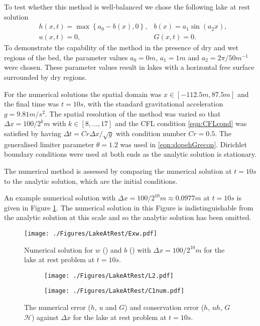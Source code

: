 \documentclass[AMA,STIX1COL]{WileyNJD-v2}
\DeclareRobustCommand{\squareF}[1]{\tikz{\filldraw[#1,fill opacity= 0.3] (0,0) rectangle (0.2cm,0.2cm);}}
\begin{document}
To test whether this method is well-balanced we chose the following lake at rest solution
	\begin{align*}
	&h(x,t) = \max\left\lbrace a_0 - b(x), 0 \right\rbrace, & b(x) = a_1 \sin\left(a_2 x\right), \\
	&u(x,t) = 0 , 	&G(x,t) = 0.
	\end{align*}
To demonstrate the capability of the method in the presence of dry and wet regions of the bed, the parameter values $a_0 = 0m$, $a_1 = 1m$ and $a_2 = 2 \pi / 50 m^{-1} $ were chosen. These parameter values result in lakes with a horizontal free surface surrounded by dry regions.

For the numerical solutions the spatial domain was $x \in \left[-112.5 m,87.5 m\right]$ and the final time was $t=10s$, with the standard gravitational acceleration $g= 9.81 m/s^2$. The spatial resolution of the method was varied so that $\Delta x = 100 / 2^k m$ with $k \in \left[8, \dots ,17\right]$ and the CFL condition \eqref{eqn:CFLcond} was satisfied by having $\Delta t = Cr \Delta x / \sqrt{g}$ with condition number $Cr = 0.5$. The generalised limiter parameter $\theta = 1.2$ was used in \eqref{eqn:slopehGrecon}. Dirichlet boundary conditions were used at both ends as the analytic solution is stationary.

The numerical method is assessed by comparing the numerical solution at $t=10s$ to the analytic solution, which are the initial conditions.

An example numerical solution with $\Delta x = 100/2^{10}m \approx 0.0977m$ at $t=10s$ is given in Figure \ref{fig:LAR}. The numerical solution in this Figure is indistinguishable from the analytic solution at this scale and so the analytic solution has been omitted. 

\begin{figure}
	\centering
		\texttt{[image: ./Figures/LakeAtRest/Exw.pdf]}
	\caption{Numerical solution for $w$ (\squareF{blue}) and $b$ (\squareF{brown!60!black}) with $\Delta x = {100} / {2^{10}}m $ for the lake at rest problem at $t=10s$.}
	\label{fig:LAR}
\end{figure}
\begin{figure}
	\centering
	\begin{subfigure}{0.49\textwidth}
		\texttt{[image: ./Figures/LakeAtRest/L2.pdf]}
		\label{fig:LARL1}
		\vspace{0.5cm}
	\end{subfigure}
	\begin{subfigure}{0.49\textwidth}
		\texttt{[image: ./Figures/LakeAtRest/C1num.pdf]}
		\label{fig:LARC}
		\vspace{0.5cm}
	\end{subfigure}
	\caption{The numerical error ($h$, $u$ and $G$) and conservation error ($h$, $uh$, $G$ $\mathcal{H}$) against $\Delta x$ for the lake at rest problem at $t=10s$. }
	\label{fig:LARL2C}
\end{figure}
\end{document}
